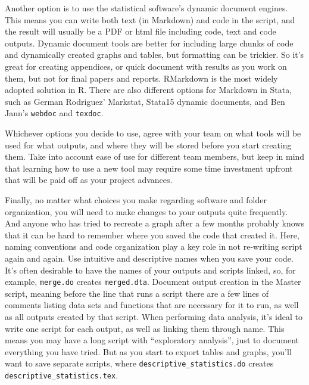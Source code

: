 Another option is to use the statistical software's dynamic document engines. 
This means you can write both text (in Markdown) and code in the script, 
and the result will usually be a PDF or html file including code, 
text and code outputs.  
Dynamic document tools are better for including large chunks of code and dynamically created graphs and tables, 
but formatting can be trickier. 
So it's great for creating appendices, 
or quick document with results as you work on them, 
but not for final papers and reports. 
RMarkdown is the most widely adopted solution in R.
There are also different options for Markdown in Stata,
such as German Rodriguez' Markstat,
Stata15 dynamic documents,
and Ben Jann's \texttt{webdoc} and 
\texttt{texdoc}. 

Whichever options you decide to use, 
agree with your team on what tools will be used for what outputs, and
where they will be stored before you start creating them. 
Take into account ease of use for different team members, but
keep in mind that learning how to use a new tool may require some 
time investment upfront that will be paid off as your project advances.

Finally, no matter what choices you make regarding software and folder organization, 
you will need to make changes to your outputs quite frequently. 
And anyone who has tried to recreate a graph after a few months probably knows 
that it can be hard to remember where you saved the code that created it. 
Here, naming conventions and code organization play a key role in not re-writing script again and again.
Use intuitive and descriptive names when you save your code. 
It's often desirable to have the names of your outputs and scripts linked, 
so, for example, \texttt{merge.do} creates \texttt{merged.dta}.
Document output creation in the Master script, 
meaning before the line that runs a script there are a few lines of comments listing 
data sets and functions that are necessary for it to run, 
as well as all outputs created by that script. 
When performing data analysis, 
it's ideal to write one script for each output, 
as well as linking them through name. 
This means you may have a long script with ``exploratory analysis'', 
just to document everything you have tried. 
But as you start to export tables and graphs, 
you'll want to save separate scripts, where 
\texttt{descriptive\_statistics.do} creates \texttt{descriptive\_statistics.tex}. 

